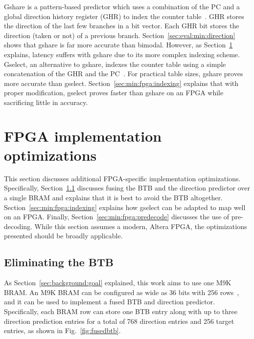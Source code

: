 Gshare is a pattern-based predictor which uses a combination of the PC and a global direction history register (GHR) to index the counter table~\cite{McFarling}. GHR stores the direction of the last few branches in a bit vector. Each GHR bit stores the direction (taken or not) of a previous branch.  Section~\ref{sec:eval:min:direction} shows that gshare is far more accurate than bimodal. However, as Section~\ref{sec:min:fpga} explains, latency suffers with gshare due to its more complex indexing scheme. Gselect, an alternative to gshare, indexes the counter table using a simple concatenation of the GHR and the PC~\cite{McFarling}. For practical table sizes, gshare proves more accurate than gselect. Section~\ref{sec:min:fpga:indexing} explains that with proper modification, gselect proves faster than gshare on an FPGA while sacrificing little in accuracy.


\section{FPGA implementation optimizations}
\label{sec:min:fpga}
This section discusses additional FPGA-specific implementation optimizations. Specifically, Section~\ref{sec:min:fpga:nobtb} discusses fusing the BTB and the direction predictor over a single BRAM and explains that it is best to avoid the BTB altogether. Section~\ref{sec:min:fpga:indexing} explains how gselect can be adapted to map well on an FPGA. Finally, Section~\ref{sec:min:fpga:predecode} discusses the use of pre-decoding. While this section assumes a modern, Altera FPGA, the optimizations presented should be broadly applicable.

\subsection{Eliminating the BTB}
\label{sec:min:fpga:nobtb}
As Section~\ref{sec:background:goal} explained, this work aims to use one M9K BRAM. An M9K BRAM can be configured as wide as 36 bits with 256 rows~\cite{StratixIVM9K}, and it can be used to implement a fused BTB and direction predictor. Specifically, each BRAM row can store one BTB entry along with up to three direction prediction entries for a total of 768 direction entries and 256 target entries, as shown in Fig.~\ref{fig:fusedbtb}.

